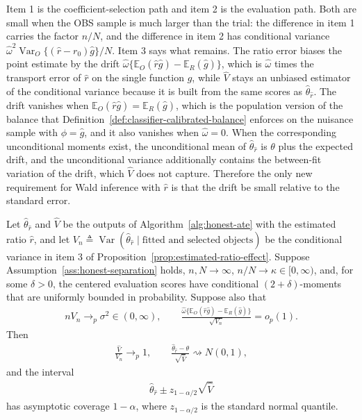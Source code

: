 Item 1 is the coefficient-selection path and item 2 is the evaluation path. Both are small when the OBS sample is much larger than the trial: the difference in item 1 carries the factor $n/N$, and the difference in item 2 has conditional variance $\widehat\omega^2\operatorname{Var}_O\{(\widehat r-r_0)\widehat g\}/N$. Item 3 says what remains. The ratio error biases the point estimate by the drift $\widehat\omega\{\mathbb E_O(\widehat r\widehat g)-\mathbb E_R(\widehat g)\}$, which is $\widehat\omega$ times the transport error of $\widehat r$ on the single function $\widehat g$, while $\widehat V$ stays an unbiased estimator of the conditional variance because it is built from the same scores as $\widehat\theta_{\widehat r}$. The drift vanishes when $\mathbb E_O(\widehat r\widehat g)=\mathbb E_R(\widehat g)$, which is the population version of the balance that Definition~\ref{def:classifier-calibrated-balance} enforces on the nuisance sample with $\phi=\widehat g$, and it also vanishes when $\widehat\omega=0$. When the corresponding unconditional moments exist, the unconditional mean of $\widehat\theta_{\widehat r}$ is $\theta$ plus the expected drift, and the unconditional variance additionally contains the between-fit variation of the drift, which $\widehat V$ does not capture. Therefore the only new requirement for Wald inference with $\widehat r$ is that the drift be small relative to the standard error.

\begin{theorem}
\label{thm:estimated-ratio-feasible-clt}
Let $\widehat\theta_{\widehat r}$ and $\widehat V$ be the outputs of Algorithm~\ref{alg:honest-ate} with the estimated ratio $\widehat r$, and let $V_n\triangleq\operatorname{Var}(\widehat\theta_{\widehat r}\mid\text{fitted and selected objects})$ be the conditional variance in item 3 of Proposition~\ref{prop:estimated-ratio-effect}. Suppose Assumption~\ref{ass:honest-separation} holds, $n,N\to\infty$, $n/N\to\kappa\in[0,\infty)$, and, for some $\delta>0$, the centered evaluation scores have conditional $(2+\delta)$-moments that are uniformly bounded in probability. Suppose also that
\begin{align}
nV_n\to_p\sigma^2\in(0,\infty),
\qquad
\frac{\widehat\omega\{\mathbb E_O(\widehat r\widehat g)-\mathbb E_R(\widehat g)\}}{\sqrt{V_n}}=o_p(1).
\label{eq:estimated-ratio-mean-rate}
\end{align}
Then
\begin{align}
\frac{\widehat V}{V_n}\to_p1,
\qquad
\frac{\widehat\theta_{\widehat r}-\theta}{\sqrt{\widehat V}}\rightsquigarrow N(0,1),
\label{eq:estimated-ratio-feasible-clt}
\end{align}
and the interval
\begin{align}
\widehat\theta_{\widehat r}\mathbin{\pm}z_{1-\alpha/2}\sqrt{\widehat V}
\label{eq:estimated-ratio-confidence-interval}
\end{align}
has asymptotic coverage $1-\alpha$, where $z_{1-\alpha/2}$ is the standard normal quantile.
\end{theorem}

